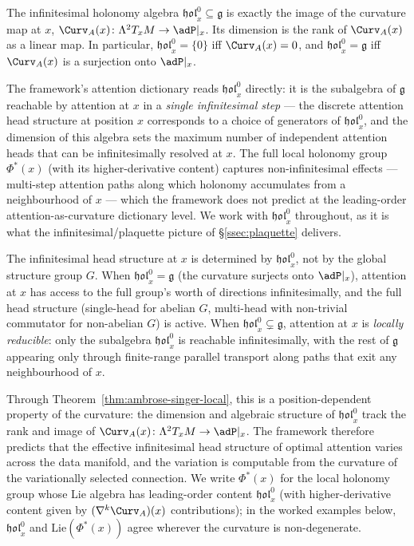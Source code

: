 \begin{theorem}\label{thm:ambrose-singer-local}
The infinitesimal holonomy algebra
$\mathfrak{hol}^0_x\subseteq\mathfrak{g}$ is exactly the image of the
curvature map at $x$, $\Curv_A(x)\colon\Lambda^2 T_xM\to\adP|_x$.
Its dimension is the rank of $\Curv_A(x)$ as a linear map. In
particular, $\mathfrak{hol}^0_x=\{0\}$ iff $\Curv_A(x)=0$, and
$\mathfrak{hol}^0_x=\mathfrak{g}$ iff $\Curv_A(x)$ is a surjection onto
$\adP|_x$.
\end{theorem}

The framework's attention dictionary reads $\mathfrak{hol}^0_x$
directly: it is the subalgebra of $\mathfrak{g}$ reachable by
attention at $x$ in a \emph{single infinitesimal step} --- the
discrete attention head structure at position $x$ corresponds to a
choice of generators of $\mathfrak{hol}^0_x$, and the dimension of
this algebra sets the maximum number of independent attention heads
that can be infinitesimally resolved at $x$. The full local
holonomy group $\Phi^*(x)$ (with its higher-derivative content)
captures non-infinitesimal effects --- multi-step attention paths
along which holonomy accumulates from a neighbourhood of $x$ ---
which the framework does not predict at the leading-order
attention-as-curvature dictionary level. We work with
$\mathfrak{hol}^0_x$ throughout, as it is what the
infinitesimal/plaquette picture of \S\ref{ssec:plaquette} delivers.

\begin{remark}
\label{rem:position-dependent-heads}
The infinitesimal head structure at $x$ is determined by
$\mathfrak{hol}^0_x$, not by the global structure group $G$. When
$\mathfrak{hol}^0_x=\mathfrak{g}$ (the curvature surjects onto
$\adP|_x$), attention at $x$ has access to the full group's worth of
directions infinitesimally, and the full head structure (single-head
for abelian $G$, multi-head with non-trivial commutator for
non-abelian $G$) is active. When
$\mathfrak{hol}^0_x\subsetneq\mathfrak{g}$, attention at $x$ is
\emph{locally reducible}: only the subalgebra
$\mathfrak{hol}^0_x$ is reachable infinitesimally, with the rest of
$\mathfrak{g}$ appearing only through finite-range parallel transport
along paths that exit any neighbourhood of $x$.

Through Theorem~\ref{thm:ambrose-singer-local}, this is a
position-dependent property of the curvature: the dimension and
algebraic structure of $\mathfrak{hol}^0_x$ track the rank and image
of $\Curv_A(x)\colon\Lambda^2 T_xM\to\adP|_x$. The framework
therefore predicts that the effective infinitesimal head structure
of optimal attention varies across the data manifold, and the
variation is computable from the curvature of the variationally
selected connection. We write $\Phi^*(x)$ for the local holonomy
group whose Lie algebra has leading-order content
$\mathfrak{hol}^0_x$ (with higher-derivative content given by
$(\nabla^k\Curv_A)(x)$ contributions); in the worked examples below,
$\mathfrak{hol}^0_x$ and $\mathrm{Lie}(\Phi^*(x))$ agree wherever
the curvature is non-degenerate.
\end{remark}

